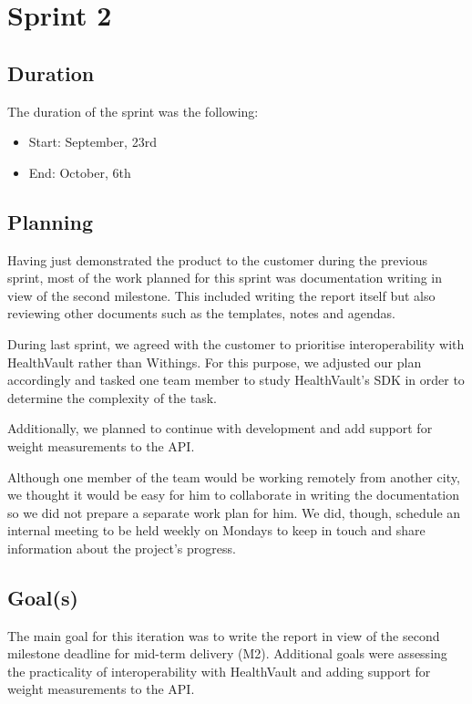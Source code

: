 
\chapter{Sprint 2}
\label{Sprint2}

\section{Duration}
The duration of the sprint was the following:
\begin{itemize}
\item Start: September, 23rd
\item End: October, 6th
\end{itemize}

\section{Planning}

Having just demonstrated the product to the customer during the previous sprint, most of the work planned for this sprint was documentation writing in view of the second milestone.
This included writing the report itself but also reviewing other documents such as the templates, notes and agendas.

During last sprint, we agreed with the customer to prioritise interoperability with HealthVault rather than Withings.
For this purpose, we adjusted our plan accordingly and tasked one team member to study HealthVault's SDK in order to determine the complexity of the task.

Additionally, we planned to continue with development and add support for weight measurements to the API.

Although one member of the team would be working remotely from another city, we thought it would be easy for him to collaborate in writing the documentation so we did not prepare a separate work plan for him.
We did, though, schedule an internal meeting to be held weekly on Mondays to keep in touch and share information about the project's progress.


\section{Goal(s)}

The main goal for this iteration was to write the report in view of the second milestone deadline for mid-term delivery (M2). 
Additional goals were assessing the practicality of interoperability with HealthVault and adding support for weight measurements to the API.

